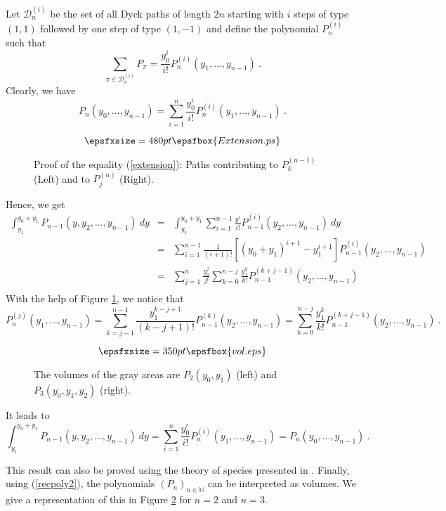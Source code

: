 \documentclass[11pt,a4paper]{article}
\numberwithin{equation}{section}
\newcommand{\D}{\mathcal{D}}
\newcommand{\1}{\mathbbm{1}}
\newcommand{\N}{\mathbb{N}}
\begin{document}
Let $\D_n^{(i)}$ be the set of all Dyck paths of length $2n$ starting
with $i$ steps of type $(1,1)$ followed by one step of type $(1,-1)$
and define the polynomial $P_n^{(i)}$ such that
\begin{equation*}
\sum_{\pi \in \D_n^{(i)}}P_{\pi}=\frac{y_0^i}{i!}P_{n}^{(i)}(y_1,\dots,y_{n-1})\:.
\end{equation*}
Clearly, we have
\begin{equation*}
P_n(y_0,\dots,y_{n-1})= \sum_{i=1}^{n}\frac{y_0^i}{i!}P_{n}^{(i)}(y_1,\dots,y_{n-1})\:.
\end{equation*}
\begin{figure}[h]
\[\epsfxsize=480pt \epsfbox{Extension.ps} \]
\caption{Proof of the equality (\ref{extension}):  Paths contributing to $P_k^{(n-1)}$ (Left) and to $P_j^{(n)}$ (Right).}
\label{extend}
\end{figure}
Hence, we get
\begin{eqnarray*}
\int_{y_1}^{y_0+y_1} P_{n-1}(y,y_2,\dots,y_{n-1})\:dy &=& \int_{y_1}^{y_0+y_1}\sum_{i=1}^{n-1}\frac{y^i}{i!}P_{n-1}^{(i)}(y_2,\dots,y_{n-1})\:dy\\
&=&\sum_{i=1}^{n-1}\frac{1}{(i+1)!}
[(y_0+y_1)^{i+1}-y_1^{i+1}]P_{n-1}^{(i)}(y_2,\dots,y_{n-1})\\
&=&\sum_{j=1}^n
\frac{y_0^j}{j!}\sum_{k=0}^{n-j}\frac{y_1^k}{k!}P_{n-1}^{(k+j-1)}(y_2,\dots,y_{n-1})\\
\end{eqnarray*}
With the help of Figure \ref{extend}, we notice that
\begin{equation}\label{extension}
P_{n}^{(j)}(y_1,\dots,y_{n-1})=\sum_{k=j-1}^{n-1}\frac{y_1^{k-j+1}}{(k-j+1)!}  P_{n-1}^{(k)}(y_2,\dots,y_{n-1})=\sum_{k=0}^{n-j}\frac{y_1^k}{k!}  P_{n-1}^{(k+j-1)}(y_2,\dots,y_{n-1})\:.
\end{equation}
\begin{figure}[hbt]
\[\epsfxsize=350pt \epsfbox{vol.eps} \]
\caption{The volumes of the gray areas are $P_2(y_0,y_1)$ (left) and
  $P_3(y_0,y_1,y_2)$ (right).}
\label{Volume}
\end{figure}

It leads to
\begin{equation*}
\int_{y_1}^{y_0+y_1} P_{n-1}(y,y_2,\dots,y_{n-1})\:dy=\sum_{i=1}^n \frac{y_0^i}{i!}P_n^{(i)}(y_1,\dots,y_{n-1})
= P_n(y_0,\dots,y_{n-1})\:.
\end{equation*}

This result can also be proved using the theory of species presented in \cite{Leroux}.
Finally, using (\ref{recpoly2}), the polynomials $(P_n)_{n\in \N}$ can be interpreted as volumes. We give a
representation of this in Figure \ref{Volume} for $n=2$ and $n=3$.
\end{document}
